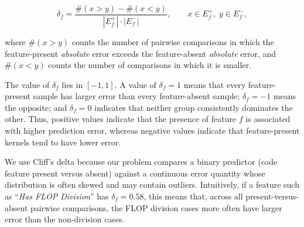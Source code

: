 \[
\delta_f
=
\frac{\#(x > y) - \#(x < y)}
{|E_f^{+}| \cdot |E_f^{-}|},
\qquad x \in E_f^{+},\; y \in E_f^{-},
\]

where $\#(x > y)$ counts the number of pairwise comparisons in which the feature-present \textit{absolute} \rai error exceeds the feature-absent \textit{absolute} \rai error, and $\#(x < y)$ counts the number of comparisons in which it is smaller.

The value of $\delta_f$ lies in $[-1,1]$. A value of $\delta_f = 1$ means that every feature-present sample has larger \rai error than every feature-absent sample; $\delta_f = -1$ means the opposite; and $\delta_f = 0$ indicates that neither group consistently dominates the other. 
Thus, positive values indicate that the presence of feature $f$ is associated with higher \rai prediction error, whereas negative values indicate that feature-present kernels tend to have lower \rai error.

We use Cliff's delta because our problem compares a binary predictor (code feature present versus absent) against a continuous error quantity whose distribution is often skewed and may contain outliers. 
Intuitively, if a feature such as ``\textit{Has FLOP Division}'' has $\delta_f = 0.58$, this means that, across all present-versus-absent pairwise comparisons, the FLOP division cases more often have larger \rai error than the non-division cases. 
















